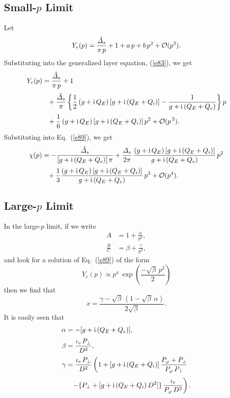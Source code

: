 \documentclass[titlepage=false,12pt]{article}
\begin{document}
\subsection{Small-$p$ Limit}
Let
\begin{equation}
Y_e(p) = \frac{\hat{\mit\Delta}_s}{\pi\,p} + 1+ a\,p+b\,p^2+{\cal O}(p^3).
\end{equation}
Substituting into the generalized layer equation, (\ref{e83}), we get
\begin{align}
Y_e(p) &= \frac{\hat{\mit\Delta}_s}{\pi\,p} + 1
\nonumber\\[0.5ex]
&\phantom{=}+\frac{\hat{\mit\Delta}_s}{\pi}\left\{
\frac{1}{2}\,(g+{\rm i}\,Q_E)\,[g+{\rm i}\,(Q_E+Q_i)]-\frac{1}{g+{\rm i}\,(Q_E+Q_e)}\right\}p\nonumber\\[0.5ex]
&\phantom{=} + \frac{1}{6}\,(g+{\rm i}\,Q_E)\,[g+{\rm i}\,(Q_E+Q_i)]\,p^2+{\cal O}(p^{\,3}).
\end{align}
Substituting into Eq.~(\ref{e89}), we get
\begin{align}
\chi(p) &= -\frac{\hat{\mit\Delta}_s}{[g+{\rm i}\,(Q_E+Q_e)]\,\pi}+\frac{{\mit\Delta}_s}{2\pi}\,\frac{(g+{\rm i}\,Q_E)\,[g+{\rm i}\,(Q_E+Q_i)]}{g+{\rm i}\,(Q_E+Q_e)}\,p^2\nonumber\\[0.5ex]
&\phantom{=} + \frac{1}{3} \frac{(g+{\rm i}\,Q_E)\,[g+{\rm i}\,(Q_E+Q_i)]}{g+{\rm i}\,(Q_E+Q_e)}\,p^3+{\cal O}(p^4).
\end{align}

\subsection{Large-$p$ Limit}
In the large-$p$ limit, if we write
\begin{align}
A &=1+\frac{\alpha}{p^2},\\[0.5ex]
\frac{B}{C} &= \beta+\frac{\gamma}{p^2},
\end{align}
and
look for a solution of Eq.~(\ref{e89}) of the form
\begin{equation}
Y_e(p) \propto p^x\,\exp\left(\frac{-\sqrt{\beta}\,p^2}{2}\right)
\end{equation}
then we find that
\begin{equation}
x = \frac{\gamma -\sqrt{\beta}\,(1-\sqrt{\beta}\,\alpha)}{2\sqrt{\beta}}.
\end{equation}
It is easily seen that
\begin{align}
\alpha &= -[g+ {\rm i}\,(Q_E+Q_e)],\\[0.5ex]
\beta&= \frac{\iota_e\,P_\perp}{D^2},\\[0.5ex]
\gamma&= \frac{\iota_e\,P_\perp}{D^2}\left(1+ [g+{\rm i}\,(Q_E+Q_i)]\,\frac{P_\varphi+P_\perp}{P_\varphi\,P_\perp}\right.\nonumber\\[0.5ex]
&\phantom{=}\left.-\{P_\perp+[g+{\rm i}\,(Q_E+Q_i)\,D^2]\}\,\frac{\iota_e}{P_\varphi\,D^2}\right).
\end{align}
\end{document}
